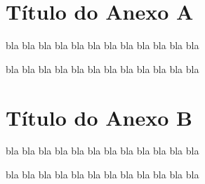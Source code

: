 
\chapter{Título do Anexo A}
\vspace{-3cm}
bla bla bla bla bla bla bla bla bla bla bla bla

bla bla bla bla bla bla bla bla bla bla bla bla


\chapter{Título do Anexo B}

bla bla bla bla bla bla bla bla bla bla bla bla

bla bla bla bla bla bla bla bla bla bla bla bla

